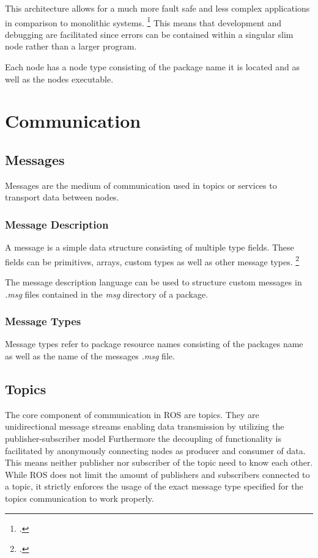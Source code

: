 This architecture allows for a much more fault safe and less complex applications in comparison to monolithic systems. \footcite[Page 94]{stephensBeginning2015}
This means that development and debugging are facilitated since errors can be contained within a singular slim node rather than a larger program. 

Each node has a node type consisting of the package name it is located and as well as the nodes executable. 



\section{Communication}

\subsection{Messages}
Messages are the medium of communication used in topics or services to transport data between nodes. 

\subsubsection{Message Description}
A message is a simple data structure consisting of multiple type fields. These fields can be primitives, arrays, custom types as well as other message types. \footcite{openSourceRoboticsFoundationMessagesNodate}

The message description language can be used to structure custom messages in
\textit{.msg} files contained in the \textit{msg} directory of a package.

\subsubsection{Message Types}
Message types refer to package resource names consisting of the packages name as well as the name of the messages \textit{.msg} file.


\subsection{Topics}
The core component of communication in ROS are topics. They are unidirectional message streams enabling data transmission by utilizing the publisher-subscriber model 
Furthermore the decoupling of functionality is facilitated by anonymously connecting nodes as producer and consumer of data. This means neither publisher nor subscriber of the topic need to know each other. 
While ROS does not limit the amount of publishers and subscribers connected to a topic, it strictly enforces the usage of the exact message type specified for the topics communication to work properly.

